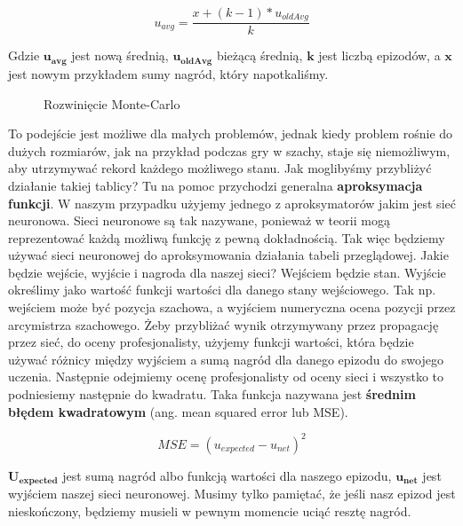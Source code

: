 \begin{equation}
u_{avg} = \frac{x + (k - 1) * u_{oldAvg}}{k}
\end{equation}

\noindent Gdzie $\boldsymbol{u_{avg}}$ jest nową średnią, $\boldsymbol{u_{oldAvg}}$ bieżącą średnią, $\boldsymbol{k}$ jest liczbą epizodów, a $\boldsymbol{x}$ jest nowym przykładem sumy nagród, który napotkaliśmy.\newline

\clearpage
\begin{figure}[H]
\centering

\caption{Rozwinięcie Monte-Carlo}
\end{figure}
\clearpage

To podejście jest możliwe dla małych problemów, jednak kiedy problem rośnie do dużych rozmiarów, jak na przykład podczas gry w szachy, staje się niemożliwym, aby utrzymywać rekord każdego możliwego stanu. Jak moglibyśmy przybliżyć działanie takiej tablicy? Tu na pomoc przychodzi generalna \textbf{aproksymacja funkcji}. W naszym przypadku użyjemy jednego z aproksymatorów jakim jest sieć neuronowa. Sieci neuronowe są tak nazywane, ponieważ w teorii mogą reprezentować każdą możliwą funkcję z pewną dokładnością. Tak więc będziemy używać sieci neuronowej do aproksymowania działania tabeli przeglądowej. Jakie będzie wejście, wyjście i nagroda dla naszej sieci? Wejściem będzie stan. Wyjście określimy jako wartość funkcji wartości dla danego stany wejściowego. Tak np. wejściem może być pozycja szachowa, a wyjściem numeryczna ocena pozycji przez arcymistrza szachowego. Żeby przybliżać wynik otrzymywany przez propagację przez sieć, do oceny profesjonalisty, użyjemy funkcji wartości, która będzie używać różnicy między wyjściem a sumą nagród dla danego epizodu do swojego uczenia. Następnie odejmiemy ocenę profesjonalisty od oceny sieci i wszystko to podniesiemy następnie do kwadratu. Taka funkcja nazywana jest \textbf{średnim błędem kwadratowym} (ang. mean squared error lub MSE).

\begin{equation}
MSE = (u_{expected} - u_{net})^2
\end{equation}

\noindent $\boldsymbol{U_{expected}}$ jest sumą nagród albo funkcją wartości dla naszego epizodu, $\boldsymbol{u_{net}}$ jest wyjściem naszej sieci neuronowej. Musimy tylko pamiętać, że jeśli nasz epizod jest nieskończony, będziemy musieli w pewnym momencie uciąć resztę nagród.\newline

